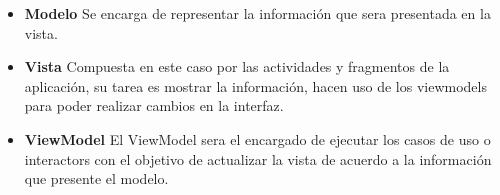 \begin{itemize}
    \item \textbf{Modelo} Se encarga de representar la información que sera presentada en la vista.
    \item \textbf{Vista} Compuesta en este caso por las actividades y fragmentos de la aplicación, su tarea es mostrar la información, hacen uso de los viewmodels para poder realizar cambios en la interfaz.
    \item \textbf{ViewModel} El ViewModel sera el encargado de ejecutar los casos de uso o interactors con el objetivo de actualizar la vista de acuerdo a la información que presente el modelo.
\end{itemize}


